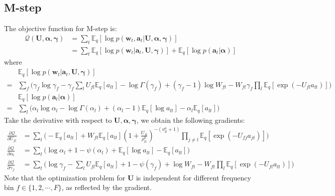 \documentclass{article} %
\begin{document}
\subsection{M-step} \label{app:m}
The objective function for M-step is:
\begin{equation}
\begin{split}
\mathcal{Q}(\mathbf{U}, \bm{\alpha}, \bm{\gamma}) &= \sum_t \mathbb{E}_q [ \log p(\bm{w}_t, \bm{a}_t | \mathbf{U}, \bm{\alpha}, \bm{\gamma}) ] \\
&= \sum_t \mathbb{E}_q [\log p(\bm{w}_t | \bm{a}_t, \mathbf{U}, \bm{\gamma})] + \mathbb{E}_q [\log p(\bm{a}_t | \bm{\alpha})] 
\end{split}
\end{equation}
where
\begin{align*}
&\mathbb{E}_q [\log p(\bm{w}_t | \bm{a}_t, \mathbf{U}, \bm{\gamma})] \\
=& \sum_f \Big( \gamma_f \log \gamma_f - \gamma_ f \sum_l U_{fl} \mathbb{E}_q [ a_{lt} ]  - \log\Gamma(\gamma_f) + (\gamma_f - 1)\log W_{ft} - W_{ft} \gamma_f \prod_l \mathbb{E}_q [ \exp(- U_{fl} a_{lt} ) ] \Big)\\
& \mathbb{E}_q [\log p(\bm{a}_t | \bm{\alpha})] \\
=&\sum_l  \Big( \alpha_l \log \alpha_l - \log \Gamma(\alpha_l) + (\alpha_l - 1)\mathbb{E}_q [ \log a_{lt} ] - \alpha_l \mathbb{E}_q [ a_{lt} ] \Big)
\end{align*}
Take the derivative with respect to $\mathbf{U}, \bm{\alpha}, \bm{\gamma}$, we obtain the following gradients:
\begin{align}
\frac{\partial \mathcal{Q}}{\partial U_{fl}} &= \sum_t \Big( - \mathbb{E}_q [ a_{lt} ] + W_{ft} \mathbb{E}_q [ a_{lt}]  (1 + \frac{U_{fl}}{\rho^a_{lt}})^{-(\nu_{lt}^a+1)} \prod_{j \neq l} \mathbb{E}_q [ \exp(- U_{fj} a_{jt}) ] \Big)\\
\frac{\partial \mathcal{Q}}{\partial \alpha_l} &=  \sum_t \Big( \log \alpha_l + 1 - \psi(\alpha_l) + \mathbb{E}_q [ \log a_{lt} ] - \mathbb{E}_q [ a_{lt} ] \Big)\\
\frac{\partial \mathcal{Q}}{\partial \gamma_f} &= \sum_t \Big( \log \gamma_f - \sum_l U_{fl} \mathbb{E}_q [ a_{lt} ] + 1 - \psi(\gamma_f)  + \log W_{ft} - W_{ft} \prod_l \mathbb{E}_q [ \exp(- U_{fl} a_{lt} ) ] \Big)
\end{align}
Note that the optimization problem for $\mathbf{U}$ is independent for different frequency bin $f\in \{1, 2, \cdots, F\}$, as reflected by the gradient. 
\end{document}
